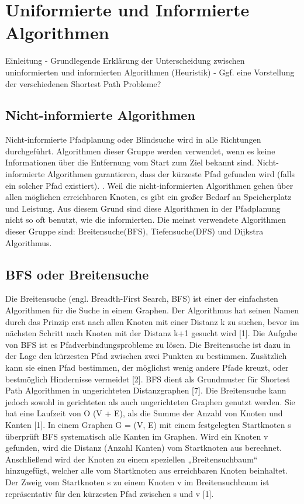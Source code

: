 \chapter{Uniformierte und Informierte Algorithmen}

Einleitung
-	Grundlegende Erklärung der Unterscheidung zwischen uninformierten und informierten Algorithmen (Heuristik) \newline
-	Ggf. eine Vorstellung der verschiedenen Shortest Path Probleme?


\section{ Nicht-informierte Algorithmen}
Nicht-informierte Pfadplanung oder Blindsuche wird in alle Richtungen durchgeführt. Algorithmen dieser Gruppe werden verwendet, wenn es keine Informationen über die Entfernung vom Start zum Ziel bekannt sind. Nicht-informierte Algorithmen garantieren, dass der kürzeste Pfad gefunden wird (falls ein solcher Pfad existiert). \cite{comAnal}. Weil die nicht-informierten Algorithmen gehen über allen möglichen erreichbaren Knoten, es gibt ein großer Bedarf an Speicherplatz und Leistung. Aus diesem Grund sind diese Algorithmen in der Pfadplanung nicht so oft benutzt, wie die informierten\cite{sim}. Die meinst verwendete Algorithmen dieser Gruppe sind: Breitensuche(BFS), Tiefensuche(DFS) und Dijkstra Algorithmus.

\section{BFS oder Breitensuche}

Die Breitensuche (engl. Breadth-First Search, BFS) ist einer der einfachsten Algorithmen für die Suche in einem Graphen. Der Algorithmus hat seinen Namen durch das Prinzip erst nach allen Knoten mit einer Distanz k zu suchen, bevor im nächsten Schritt nach Knoten mit der Distanz k+1 gesucht wird [1]. Die Aufgabe von BFS ist es Pfadverbindungsprobleme zu lösen. Die Breitensuche ist dazu in der Lage den kürzesten Pfad zwischen zwei Punkten zu bestimmen. Zusätzlich kann sie einen Pfad bestimmen, der möglichst wenig andere Pfade kreuzt, oder bestmöglich Hindernisse vermeidet [2]. BFS dient als Grundmuster für Shortest Path Algorithmen in ungerichteten Distanzgraphen [7]. Die Breitensuche kann jedoch sowohl in gerichteten als auch ungerichteten Graphen genutzt werden. Sie hat eine Laufzeit von O (V + E), als die Summe der Anzahl von Knoten und Kanten [1].
In einem Graphen G = (V, E) mit einem festgelegten Startknoten s überprüft BFS systematisch alle Kanten im Graphen. Wird ein Knoten v gefunden, wird die Distanz (Anzahl Kanten) vom Startknoten aus berechnet. Anschließend wird der Knoten zu einem speziellen „Breitensuchbaum“ hinzugefügt, welcher alle vom Startknoten aus erreichbaren Knoten beinhaltet. Der Zweig vom Startknoten s zu einem Knoten v im Breitensuchbaum ist repräsentativ für den kürzesten Pfad zwischen s und v [1].

